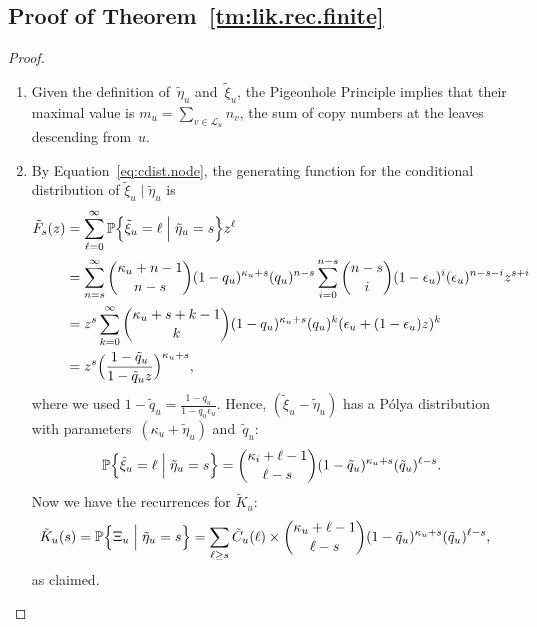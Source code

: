 \documentclass{elsarticle}
\newcommand{\condgen}[6]{{#1}#2 #5 #3 #6 #4}
\newcommand{\PROB}{\mathbb{P}}
\newcommand{\Probcmd}[2]{\condgen{\PROB}{\Bigl\{}{\Bigm|}{\Bigr\}}{#1}{#2}}
\newcommand{\nlik}{C}
\newcommand{\slik}{K}
\newcommand{\nx}{u}
\newcommand{\ny}{v}
\begin{document}
\subsection{Proof of Theorem~\ref{tm:lik.rec.finite}}
\begin{proof}
\begin{enumerate}[label=(\roman*)]
\item Given the definition of~$\tilde{\eta}_{\nx}$ and~$\tilde{\xi}_{\nx}$, 
the Pigeonhole Principle implies that their maximal value is 
$m_{\nx}=\sum_{\ny\in \mathcal{L}_{\nx}} n_{\ny}$, the sum of copy numbers at the 
leaves descending from~$\nx$.  
\item 
By Equation~\eqref{eq:cdist.node},
the generating function for the 
conditional distribution 
of $\tilde{\xi}_{\nx} \mid \tilde{\eta}_{\nx}$ is 
\begin{align*}
\tilde{F}_s(z) & = \sum_{\ell=0}^{\infty} \Probcmd{\tilde{\xi}_{\nx}=\ell}{\tilde{\eta}_{\nx}=s}z^\ell
\\
	& = \sum_{n=s}^{\infty} \binom{\kappa_{\nx}+n-1}{n-s}(1-q_{\nx})^{\kappa_{\nx}+s}  (q_{\nx})^{n-s} 
		\sum_{i=0}^{n-s} \binom{n-s}{i}(1-\epsilon_{\nx})^{i}(\epsilon_{\nx})^{n-s-i}z^{s+i}
\\
	& = z^s\sum_{k=0}^{\infty}	\binom{\kappa_{\nx}+s+k-1}{k} (1-q_{\nx})^{\kappa_{\nx}+s} (q_{\nx})^k (\epsilon_{\nx}+(1-\epsilon_{\nx})z)^{k}	
\\
	& = z^{s} \Bigl(\frac{1-\tilde{q}_{\nx}}{1-\tilde{q}_{\nx} z}\Bigr)^{\kappa_{\nx}+s},
\end{align*}
where we used $1-\tilde{q}_{\nx}=\frac{1-q_{\nx}}{1-q_{\nx}\epsilon_{\nx}}$.  
Hence, 
$(\tilde{\xi}_{\nx}-\tilde{\eta}_{\nx})$ 
has a P{\'o}lya distribution with parameters~$(\kappa_{\nx}+\tilde{\eta}_{\nx})$ 
and~$\tilde{q}_{\nx}$:
\begin{equation}\label{eq:survival.node.dist}
\Probcmd{\tilde{\xi}_{\nx}=\ell}{\tilde{\eta}_{\nx}=s}
	= \binom{\kappa_i+\ell-1}{\ell-s} (1-\tilde{q}_{\nx})^{\kappa_{\nx}+s} (\tilde{q}_{\nx})^{\ell-s}.
\end{equation}
Now we have the recurrences for $\tilde{\slik}_{\nx}$:
\begin{align*}
\tilde{\slik}_{\nx}(s) & = \Probcmd{\Xi_{\nx}}{\tilde{\eta}_{\nx}=s}
= \sum_{\ell\ge s}
	\tilde{\nlik}_{\nx}(\ell)	
	\times
	\binom{\kappa_{\nx}+\ell-1}{\ell-s} (1-\tilde{q}_{\nx})^{\kappa_{\nx}+s} (\tilde{q}_{\nx})^{\ell-s},
\end{align*}
as claimed.


\end{enumerate}
\end{proof}
\end{document}
